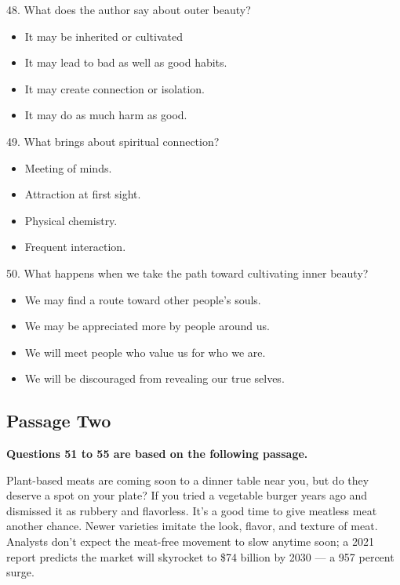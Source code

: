 \documentclass[UTF8,11pt]{ctexart}
\begin{document}
48. What does the author say about outer beauty?


\begin{itemize}[leftmargin=2em,itemsep=.2em,topsep=.4em]\item[A.] It may be inherited or cultivated
\item[B.] It may lead to bad as well as good habits.
\item[C.] It may create connection or isolation.
\item[D.] It may do as much harm as good.
\end{itemize}

49. What brings about spiritual connection?


\begin{itemize}[leftmargin=2em,itemsep=.2em,topsep=.4em]\item[A.] Meeting of minds.
\item[B.] Attraction at first sight.
\item[C.] Physical chemistry.
\item[D.] Frequent interaction.
\end{itemize}

50. What happens when we take the path toward cultivating inner beauty?


\begin{itemize}[leftmargin=2em,itemsep=.2em,topsep=.4em]\item[A.] We may find a route toward other people’s souls.
\item[B.] We may be appreciated more by people around us.
\item[C.] We will meet people who value us for who we are.
\item[D.] We will be discouraged from revealing our true selves.
\end{itemize}

\subsection*{\textbf{Passage Two}}


\textbf{Questions 51 to 55 are based on the following passage.}


Plant-based meats are coming soon to a dinner table near you, but do they deserve a spot on your plate? If you tried a vegetable burger years ago and dismissed it as rubbery and flavorless. It’s a good time to give meatless meat another chance. Newer varieties imitate the look, flavor, and texture of meat. Analysts don’t expect the meat-free movement to slow anytime soon; a 2021 report predicts the market will skyrocket to \$74 billion by 2030 — a 957 percent surge.
\end{document}
